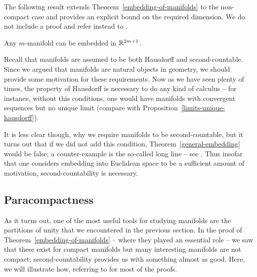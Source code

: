 The following result extends Theorem~\ref{embedding-of-manifolds} to the non-compact case and provides an explicit bound on the required dimension. We do not include a proof and refer instead to \cite[\S 50, Exercises~6--7]{Mun}.

\begin{thm}
  \label{general-embedding}
  Any $m$-manifold can be embedded in $\mathbb{R}^{2m+1}$.
\end{thm}
Recall that manifolds are assumed to be both Hausdorff and second-countable. Since we argued that manifolds are natural objects in geometry, we should provide some motivation for these requirements. Now as we have seen plenty of times, the property of Hausdorff is necessary to do any kind of calculus -- for instance, without this conditions, one would have manifolds with convergent sequences but no unique limit (compare with Proposition~\ref{limits-unique-hausdorff}).

It is less clear though, why we require manifolds to be second-countable, but it turns out that if we did not add this condition, Theorem~\ref{general-embedding} would be false; a counter-example is the so-called long line -- see \cite[\S 24, Exercise~12]{Mun}. Thus insofar that one considers embedding into Euclidean space to be a sufficient amount of motivation, second-countability is necessary.

\subsection{Paracompactness}
As it turns out, one of the most useful tools for studying manifolds are the partitions of unity that we encountered in the previous section. In the proof of Theorem~\ref{embedding-of-manifolds} -- where they played an essential role -- we saw that these exist for compact manifolds but many interesting manifolds are not compact; second-countability provides us with something almost as good. Here, we will illustrate how, referring to \cite{Mun} for most of the proofs.


